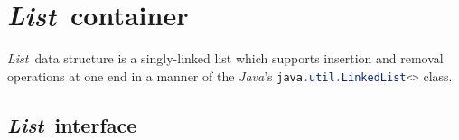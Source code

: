 \documentclass[a4paper]{article}
\newcommand{\Java}{\emph{Java}}
\begin{document}


\newcommand{\List}{\emph{List}}
\section{\List\ container}


\List\ data structure is a singly-linked list which supports insertion and removal operations at one end in a manner of the \Java's \lstinline[language=Java]{java.util.LinkedList<>} class.


\subsection{\List\ interface}
\end{document}
